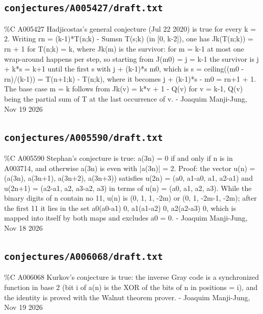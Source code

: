 \subsection*{\texttt{conjectures/A005427/draft.txt}}
{\small\raggedright\ttfamily
\%C A005427 Hadjicostas's general conjecture (Jul 22 2020) is true for every k = 2. Writing rn = (k-1)*T(n;k) - Sumsn T(s;k) (in [0, k-2]), one has Jk(T(n;k)) = rn + 1 for T(n;k) = k, where Jk(m) is the survivor: for m = k-1 at most one wrap-around happens per step, so starting from J(m0) = j = k-1 the survivor is j + k*s = k+1 until the first s with j + (k-1)*s  m0, which is s = ceiling((m0 - rn)/(k-1)) = T(n+1;k) - T(n;k), where it becomes j + (k-1)*s - m0 = rn+1 + 1. The base case m = k follows from Jk(v) = k*v + 1 - Q(v) for v = k-1, Q(v) being the partial sum of T at the last occurrence of v. - Joaquim Manji-Jung, Nov 19 2026\par
}
\subsection*{\texttt{conjectures/A005590/draft.txt}}
{\small\raggedright\ttfamily
\%C A005590 Stephan's conjecture is true: a(3n) = 0 if and only if n is in A003714, and otherwise a(3n) is even with |a(3n)| = 2. Proof: the vector u(n) = (a(3n), a(3n+1), a(3n+2), a(3n+3)) satisfies u(2n) = (a0, a1-a0, a1, a2-a1) and u(2n+1) = (a2-a1, a2, a3-a2, a3) in terms of u(n) = (a0, a1, a2, a3). While the binary digits of n contain no 11, u(n) is (0, 1, 1, -2m) or (0, 1, -2m-1, -2m); after the first 11 it lies in the set a0(a0-a1)  0, a1(a1-a2)  0, a2(a2-a3)  0, which is mapped into itself by both maps and excludes a0 = 0. - Joaquim Manji-Jung, Nov 18 2026\par
}
\subsection*{\texttt{conjectures/A006068/draft.txt}}
{\small\raggedright\ttfamily
\%C A006068 Kurkov's conjecture is true: the inverse Gray code is a synchronized function in base 2 (bit i of a(n) is the XOR of the bits of n in positions = i), and the identity is proved with the Walnut theorem prover. - Joaquim Manji-Jung, Nov 19 2026\par
}
